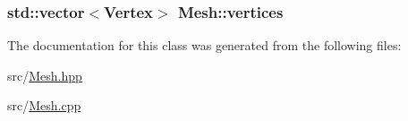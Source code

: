 \subsubsection[{\texorpdfstring{vertices}{vertices}}]{\setlength{\rightskip}{0pt plus 5cm}std\+::vector$<${\bf Vertex}$>$ Mesh\+::vertices}\hypertarget{classMesh_a6465a888c97232a39e12aad008c969c3}{}\label{classMesh_a6465a888c97232a39e12aad008c969c3}


The documentation for this class was generated from the following files\+:\begin{DoxyCompactItemize}
\item 
src/\hyperlink{Mesh_8hpp}{Mesh.\+hpp}\item 
src/\hyperlink{Mesh_8cpp}{Mesh.\+cpp}\end{DoxyCompactItemize}
